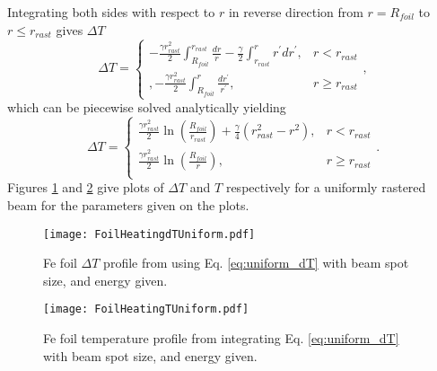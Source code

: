 \documentclass[12pt]{article}
\begin{document}
Integrating both sides with respect to $r$ in reverse direction from $r=R_{foil}$ to $r\leq r_{rast}$ gives $\Delta T$ 
\[
\Delta T=
\begin{cases}
-\frac{\gamma r_{rast}^2}{2}\int_{R_{foil}}^{r_{rast}}\frac{dr}{r}-\frac{\gamma}{2}\int_{r_{rast}}^r r^\prime dr^\prime,& r<r_{rast}\\,
-\frac{\gamma r_{rast}^2}{2}\int_{R_{foil}}^{r}\frac{dr^\prime}{r^\prime},& r\geq r_{rast}

\end{cases},
\]
which can be piecewise solved analytically yielding
\begin{equation}
\label{eq:uniform_dT}
\Delta T = 
\begin{cases}
\frac{\gamma r_{rast}^2}{2}\ln{\left(\frac{R_{foil}}{r_{rast}}\right)}+\frac{\gamma}{4}\left(r_{rast}^2-r^2\right),& r <r_{rast}\\
\frac{\gamma r_{rast}^2}{2}\ln{\left(\frac{R_{foil}}{r}\right)},& r \geq r_{rast}\\

\end{cases}.
\end{equation}
Figures \ref{fig:foilheating_uni} and \ref{fig:foilheatingT_uni} give plots of $\Delta T$ and $T$ respectively for a uniformly rastered beam for the parameters given on the plots.

\begin{figure}[h]
\centering
\texttt{[image: FoilHeatingdTUniform.pdf]}
\caption{\label{fig:foilheating_uni}Fe foil $\Delta T$ profile from using Eq. \ref{eq:uniform_dT} with beam spot size, and energy given.}
\end{figure}
\begin{figure}[h]
\centering
\texttt{[image: FoilHeatingTUniform.pdf]}
\caption{\label{fig:foilheatingT_uni}Fe foil temperature profile from integrating Eq. \ref{eq:uniform_dT} with beam spot size, and energy given.}
\end{figure}

\clearpage
\end{document}
